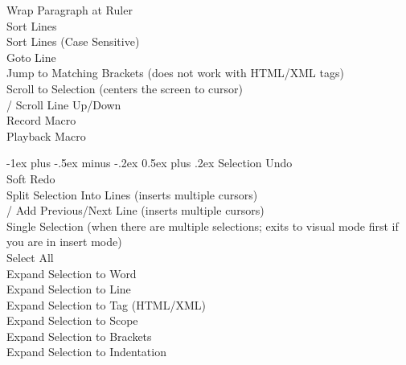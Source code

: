 \documentclass[10pt,landscape]{article}
\makeatletter
\renewcommand{\section}{\@startsection{section}{1}{0mm}%
                                {-1ex plus -.5ex minus -.2ex}%
                                {0.5ex plus .2ex}%
                                {\normalfont\large\bfseries}}
\makeatother
\begin{document}
\begin{multicols}{3}
 Wrap Paragraph at Ruler \\
 Sort Lines \\
 Sort Lines (Case Sensitive) \\
 Goto Line \\
 Jump to Matching Brackets (does not work with HTML/XML tags) \\
 Scroll to Selection (centers the screen to cursor) \\
\keys{\ctrl+\Alt+\arrowkeyup}/\keys{\arrowkeydown} Scroll Line Up/Down \\
 Record Macro \\
 Playback Macro

\section{Selection}
 Undo \\
 Soft Redo \\
 Split Selection Into Lines (inserts multiple cursors) \\
\keys{\ctrl+\shift+\arrowkeyup}/\keys{\arrowkeydown} Add Previous/Next Line (inserts multiple cursors) \\
\keys{\esc} Single Selection (when there are multiple selections; exits to visual mode first if you are in insert mode) \\
 Select All \\
 Expand Selection to Word \\
 Expand Selection to Line \\
 Expand Selection to Tag (HTML/XML) \\
\keys{\cmd+\shift+\space} Expand Selection to Scope \\
 Expand Selection to Brackets \\
 Expand Selection to Indentation \\


\end{multicols}
\end{document}
